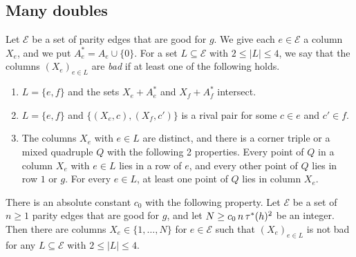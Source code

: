 \subsection{Many doubles}

Let $\mathcal E$ be a set of parity edges that are good for $g$. We give each
$e\in\mathcal E$ a column $X_e$, and we put $A_e^*=A_e\cup\{0\}$. For a set
$L\subseteq\mathcal E$ with $2\le|L|\le4$, we say that the columns $(X_e)_{e\in L}$ are
\emph{bad} if at least one of the following holds.
\begin{enumerate}[(B1)]
\item $L=\{e,f\}$ and the sets $X_e+A_e^*$ and $X_f+A_f^*$ intersect.
\item $L=\{e,f\}$ and $\{(X_e,c),(X_f,c')\}$ is a rival pair for some $c\in e$ and
$c'\in f$.
\item The columns $X_e$ with $e\in L$ are distinct, and there is a corner triple or a
mixed quadruple $Q$ with the following 2 properties. Every point of $Q$ in a column $X_e$
with $e\in L$ lies in a row of $e$, and every other point of $Q$ lies in row $1$ or $g$.
For every $e\in L$, at least one point of $Q$ lies in column $X_e$.
\end{enumerate}

\begin{lemma}[placement]\label{lem:placement}
There is an absolute constant $c_0$ with the following property. Let $\mathcal E$ be a
set of $n\ge1$ parity edges that are good for $g$, and let $N\ge c_0\,n\,{\tau^*}(h)^2$ be
an integer. Then there are columns $X_e\in\{1,\dots,N\}$ for $e\in\mathcal E$ such that
$(X_e)_{e\in L}$ is not bad for any $L\subseteq\mathcal E$ with $2\le|L|\le4$.
\end{lemma}

